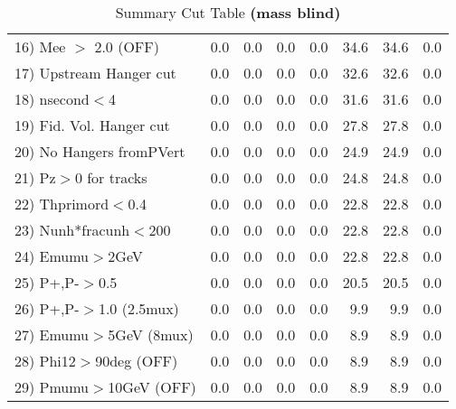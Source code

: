 \begin{table}[h!]
{{\begin{tabular}{||l||r|r|r|r|r||r||r||}
 16) Mee $>$ 2.0  (OFF)   &       0.0 &       0.0 &       0.0 &       0.0 &      34.6 &      34.6 &       0.0 \\
 17) Upstream Hanger cut  &       0.0 &       0.0 &       0.0 &       0.0 &      32.6 &      32.6 &       0.0 \\
 18) nsecond$<$4          &       0.0 &       0.0 &       0.0 &       0.0 &      31.6 &      31.6 &       0.0 \\
 19) Fid. Vol. Hanger cut &       0.0 &       0.0 &       0.0 &       0.0 &      27.8 &      27.8 &       0.0 \\
 20) No Hangers fromPVert &       0.0 &       0.0 &       0.0 &       0.0 &      24.9 &      24.9 &       0.0 \\
 21) Pz$>$0 for tracks    &       0.0 &       0.0 &       0.0 &       0.0 &      24.8 &      24.8 &       0.0 \\
 22) Thprimord$<$0.4      &       0.0 &       0.0 &       0.0 &       0.0 &      22.8 &      22.8 &       0.0 \\
 23) Nunh*fracunh$<$200   &       0.0 &       0.0 &       0.0 &       0.0 &      22.8 &      22.8 &       0.0 \\
 24) Emumu$>$2GeV         &       0.0 &       0.0 &       0.0 &       0.0 &      22.8 &      22.8 &       0.0 \\
 25) P+,P-$>$0.5          &       0.0 &       0.0 &       0.0 &       0.0 &      20.5 &      20.5 &       0.0 \\
 26) P+,P-$>$1.0 (2.5mux) &       0.0 &       0.0 &       0.0 &       0.0 &       9.9 &       9.9 &       0.0 \\
 27) Emumu$>$5GeV  (8mux) &       0.0 &       0.0 &       0.0 &       0.0 &       8.9 &       8.9 &       0.0 \\
 28) Phi12$>$90deg  (OFF) &       0.0 &       0.0 &       0.0 &       0.0 &       8.9 &       8.9 &       0.0 \\
 29) Pmumu$>$10GeV  (OFF) &       0.0 &       0.0 &       0.0 &       0.0 &       8.9 &       8.9 &       0.0 \\
 \hline
 \hline
 \end{tabular}
 \caption{Summary Cut Table \textbf{ (mass blind)}}
 \label{tab-sumcut}
 }}
 \end{table}
 \endinput
